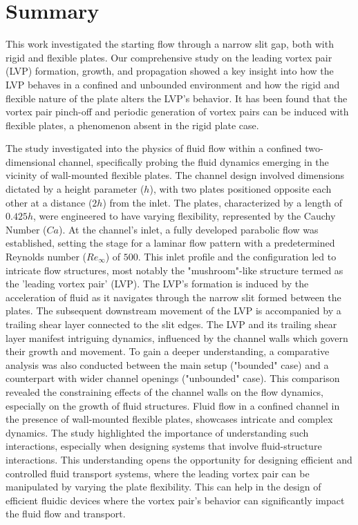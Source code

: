 \documentclass[final,3p,times,authoryear]{elsarticle}
\begin{document}
\section{Summary}\label{sec:Summary}

This work investigated the starting flow through a narrow slit gap, both with rigid and flexible plates. Our comprehensive study on the leading vortex pair (LVP) formation, growth, and propagation showed a key insight into how the LVP behaves in a confined and unbounded environment and how the rigid and flexible nature of the plate alters the LVP's behavior. It has been found that the vortex pair pinch-off and periodic generation of vortex pairs can be induced with flexible plates, a phenomenon absent in the rigid plate case.

The study investigated into the physics of fluid flow within a confined two-dimensional channel, specifically probing the fluid dynamics emerging in the vicinity of wall-mounted flexible plates. The channel design involved dimensions dictated by a height parameter ($h$), with two plates positioned opposite each other at a distance ($2h$) from the inlet. The plates, characterized by a length of $0.425h$, were engineered to have varying flexibility, represented by the Cauchy Number ($Ca$). At the channel's inlet, a fully developed parabolic flow was established, setting the stage for a laminar flow pattern with a predetermined Reynolds number ($Re_\infty$) of $500$. This inlet profile and the configuration led to intricate flow structures, most notably the "mushroom"-like structure termed as the 'leading vortex pair' (LVP). The LVP's formation is induced by the acceleration of fluid as it navigates through the narrow slit formed between the plates. The subsequent downstream movement of the LVP is accompanied by a trailing shear layer connected to the slit edges. The LVP and its trailing shear layer manifest intriguing dynamics, influenced by the channel walls which govern their growth and movement. To gain a deeper understanding, a comparative analysis was also conducted between the main setup ("bounded" case) and a counterpart with wider channel openings ("unbounded" case). This comparison revealed the constraining effects of the channel walls on the flow dynamics, especially on the growth of fluid structures. Fluid flow in a confined channel in the presence of wall-mounted flexible plates, showcases intricate and complex dynamics. The study highlighted the importance of understanding such interactions, especially when designing systems that involve fluid-structure interactions. This understanding opens the opportunity for designing efficient and controlled fluid transport systems, where the leading vortex pair can be manipulated by varying the plate flexibility. This can help in the design of efficient fluidic devices where the vortex pair's behavior can significantly impact the fluid flow and transport.
\end{document}

